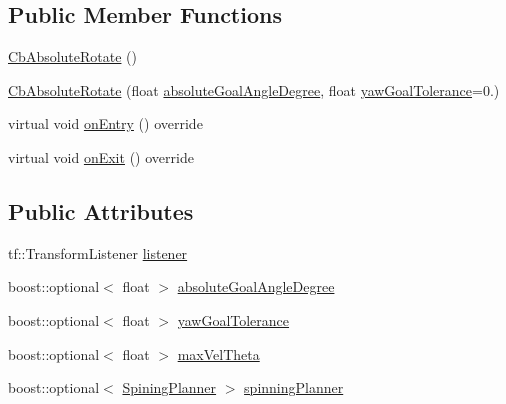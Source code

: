 \subsection*{Public Member Functions}
\begin{DoxyCompactItemize}
\item 
\hyperlink{classcl__move__base__z_1_1CbAbsoluteRotate_a378516095c2ad66f52e50f6d7c32678e}{Cb\+Absolute\+Rotate} ()
\item 
\hyperlink{classcl__move__base__z_1_1CbAbsoluteRotate_ac2149ffade91cd127e476b3ece3300dd}{Cb\+Absolute\+Rotate} (float \hyperlink{classcl__move__base__z_1_1CbAbsoluteRotate_ad5d0e21549940444e1cb525cda73329a}{absolute\+Goal\+Angle\+Degree}, float \hyperlink{classcl__move__base__z_1_1CbAbsoluteRotate_a8d8b5b9c2c821efe101bb07c96c4bdd3}{yaw\+Goal\+Tolerance}=0.)
\item 
virtual void \hyperlink{classcl__move__base__z_1_1CbAbsoluteRotate_a10418ea360809fa649d295716b152b2b}{on\+Entry} () override
\item 
virtual void \hyperlink{classcl__move__base__z_1_1CbAbsoluteRotate_a0e362b8e9f0d7de5aeee183ba4031437}{on\+Exit} () override
\end{DoxyCompactItemize}
\subsection*{Public Attributes}
\begin{DoxyCompactItemize}
\item 
tf\+::\+Transform\+Listener \hyperlink{classcl__move__base__z_1_1CbAbsoluteRotate_ad946bb6486dc35baf03ec1cc430a3406}{listener}
\item 
boost\+::optional$<$ float $>$ \hyperlink{classcl__move__base__z_1_1CbAbsoluteRotate_ad5d0e21549940444e1cb525cda73329a}{absolute\+Goal\+Angle\+Degree}
\item 
boost\+::optional$<$ float $>$ \hyperlink{classcl__move__base__z_1_1CbAbsoluteRotate_a8d8b5b9c2c821efe101bb07c96c4bdd3}{yaw\+Goal\+Tolerance}
\item 
boost\+::optional$<$ float $>$ \hyperlink{classcl__move__base__z_1_1CbAbsoluteRotate_ac0018b01a202dd805e3d3b50ed205d23}{max\+Vel\+Theta}
\item 
boost\+::optional$<$ \hyperlink{classcl__move__base__z_1_1CbAbsoluteRotate_ab8d45e43594a3fc6a71c08f07b5dbef0}{Spining\+Planner} $>$ \hyperlink{classcl__move__base__z_1_1CbAbsoluteRotate_a17d836524599af072cf2e3488e491a91}{spinning\+Planner}
\end{DoxyCompactItemize}
